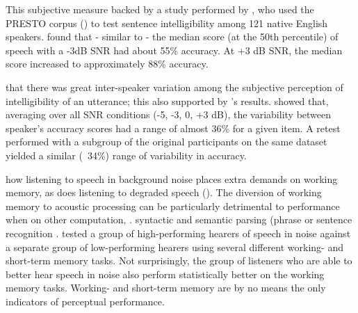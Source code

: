 This subjective measure \DIFdelbegin {}\DIFdelend \DIFaddbegin {}\DIFaddend backed by a study performed by \cite{gilbert:13}, who used the PRESTO corpus (\cite{garofolo:93}) to test sentence intelligibility among 121 native English speakers.  \cite{gilbert:13} found that - similar to \cite{ding:13} - the median score (at the 50th percentile) of speech with a -3dB SNR had about 55\% accuracy.  At +3 dB SNR, the median score increased to approximately 88\% accuracy.

\cite{ding:13} \DIFdelbegin {}\DIFdelend \DIFaddbegin {}\DIFaddend that there was great inter-speaker variation among the \DIFdelbegin {}\DIFdelend \DIFaddbegin {}\DIFaddend subjective perception of intelligibility of an utterance; this \DIFdelbegin {}\DIFdelend \DIFaddbegin {}\DIFaddend also supported by \cite{gilbert:13}'s results. \DIFdelbegin {}\DIFdelend \DIFaddbegin {}\DIFaddend showed that, averaging over all SNR conditions (-5, -3, 0, +3 dB), the variability between speaker's accuracy scores had a range of almost 36\% for a given item.  A retest performed with a subgroup of the original participants on the same dataset yielded a similar (~34\%) range of variability in accuracy.  

\cite{francis:10} \DIFdelbegin {}\DIFdelend \DIFaddbegin {}\DIFaddend how listening to speech in background noise places extra demands on working memory, as does listening to degraded speech (\cite{francis:09}).  The diversion of working memory to acoustic processing can be particularly detrimental to performance when \DIFdelbegin {}\DIFdelend \DIFaddbegin {}\DIFaddend on other computation, \DIFdelbegin {}\DIFdelend \DIFaddbegin {}\DIFaddend . syntactic and semantic parsing (\DIFdelbegin {}\DIFdelend \DIFaddbegin {}\DIFaddend phrase or sentence recognition \DIFaddbegin {}\DIFaddend . \cite{tamati:13} tested a group of high-performing hearers of speech in noise against a separate group of low-performing hearers \DIFaddbegin {}\DIFaddend using several different working- and short-term memory tasks.  Not surprisingly, the group of listeners who are able to better hear speech in noise also perform statistically better on the working memory tasks.  Working- and short-term memory are by no means the only indicators of perceptual performance.


